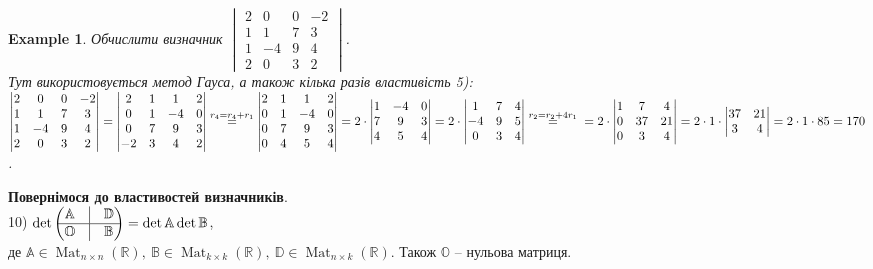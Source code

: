 \documentclass[a4paper, 10pt]{article}
\theoremstyle{theoremdd}
\newtheorem{example}[theorem]{Example}
\DeclareMathOperator{\Mat}{Mat}
\begin{document}
\begin{example}
Обчислити визначник $\begin{vmatrix}
2 & 0 & 0 & -2 \\
1 & 1 & 7 & 3 \\
1 & -4 & 9 & 4 \\
2 & 0 & 3 & 2
\end{vmatrix}$.\\
Тут використовується метод Гауса, а також кілька разів властивість 5):\\
$\begin{vmatrix}
2 & 0 & 0 & -2 \\
1 & 1 & 7 & 3 \\
1 & -4 & 9 & 4 \\
2 & 0 & 3 & 2
\end{vmatrix} = \begin{vmatrix}
2 & 1 & 1 & 2 \\
0 & 1 & -4 & 0 \\
0 & 7 & 9 & 3 \\
-2 & 3 & 4 & 2
\end{vmatrix} \overset{r_4 = r_4 + r_1}{=} \begin{vmatrix}
2 & 1 & 1 & 2 \\
0 & 1 & -4 & 0 \\
0 & 7 & 9 & 3 \\
0 & 4 & 5 & 4
\end{vmatrix} = 2 \cdot \begin{vmatrix}
1 & -4 & 0 \\
7 & 9 & 3 \\
4 & 5 & 4
\end{vmatrix} = 2 \cdot \begin{vmatrix}
1 & 7 & 4 \\
-4 & 9 & 5 \\
0 & 3 & 4
\end{vmatrix} \overset{r_2 = r_2 + 4r_1}{=} \\ = 2 \cdot \begin{vmatrix}
1 & 7 & 4 \\
0 & 37 & 21 \\
0 & 3 & 4
\end{vmatrix} = 2 \cdot 1 \cdot \begin{vmatrix}
37 & 21 \\
3 & 4
\end{vmatrix} = 2 \cdot 1 \cdot 85 = 170$.
\end{example}
\noindent
\textbf{Повернімося до властивостей визначників}.\\
10) $\det \begin{pmatrix}
 \mathbb{A} & \vline & \mathbb{D} \\
 \hline
 \mathbb{O} & \vline & \mathbb{B}
\end{pmatrix} = \det \mathbb{A} \det \mathbb{B}$,\\ 
де $\mathbb{A} \in \Mat_{n \times n}(\mathbb{R}),\ \mathbb{B} \in \Mat_{k \times k}(\mathbb{R}),\ \mathbb{D} \in \Mat_{n \times k}(\mathbb{R})$. Також $\mathbb{O}$ -- нульова матриця.
\end{document}
